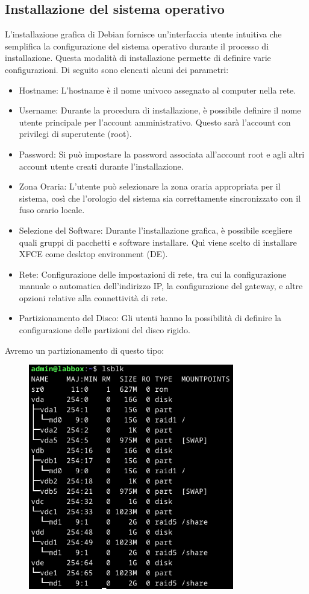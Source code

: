 \documentclass[11pt]{article}
\begin{document}
\subsection{Installazione del sistema operativo}
L'installazione grafica di Debian fornisce un'interfaccia utente intuitiva che semplifica la configurazione del sistema operativo durante il processo di installazione. Questa modalità di installazione permette di definire varie configurazioni. Di seguito sono elencati alcuni dei parametri:
\begin{itemize}
    \item Hostname: L'hostname è il nome univoco assegnato al computer nella rete.
    \item Username: Durante la procedura di installazione, è possibile definire il nome utente principale per l'account amministrativo. Questo sarà l'account con privilegi di superutente (root).
    \item Password: Si può impostare la password associata all'account root e agli altri account utente creati durante l'installazione.
    \item Zona Oraria: L'utente può selezionare la zona oraria appropriata per il sistema, così che l'orologio del sistema sia correttamente sincronizzato con il fuso orario locale.
    \item Selezione del Software: Durante l'installazione grafica, è possibile scegliere quali gruppi di pacchetti e software installare. Quì viene scelto di installare XFCE come desktop environment (DE).
    \item Rete: Configurazione delle impostazioni di rete, tra cui la configurazione manuale o automatica dell'indirizzo IP, la configurazione del gateway, e altre opzioni relative alla connettività di rete.
    \item Partizionamento del Disco: Gli utenti hanno la possibilità di definire la configurazione delle partizioni del disco rigido.
\end{itemize}
Avremo un partizionamento di questo tipo:
\begin{figure}[H]
    \includegraphics[width=0.8\textwidth, keepaspectratio]{../img/lsblk.png}
    \centering
\end{figure}
\end{document}
